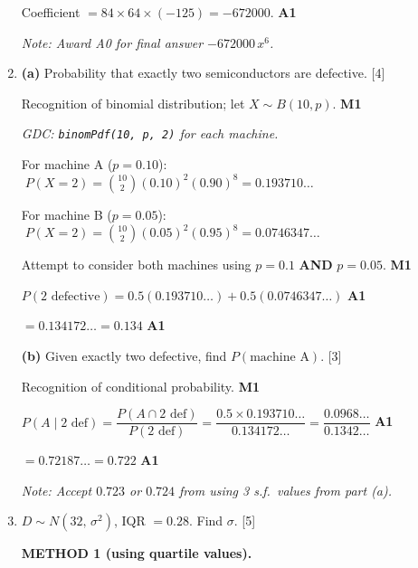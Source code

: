 \documentclass[12pt, twoside]{article}
\begin{document}
\begin{enumerate}[itemsep=0.3cm]
Coefficient $= 84 \times 64 \times (-125) = -672000$. \hfill \textbf{A1}

\textit{Note: Award A0 for final answer $-672000\,x^{6}$.}

\medskip

\item[3.] [Maximum mark: 7]

\textbf{(a)} Probability that exactly two semiconductors are defective. \hfill [4]

\medskip

Recognition of binomial distribution; let $X \sim B(10, p)$. \hfill \textbf{M1}

\textit{GDC: \texttt{binomPdf(10, p, 2)} for each machine.}

For machine A ($p = 0.10$): $\;P(X = 2) = \binom{10}{2}(0.10)^{2}(0.90)^{8} = 0.193710\ldots$

For machine B ($p = 0.05$): $\;P(X = 2) = \binom{10}{2}(0.05)^{2}(0.95)^{8} = 0.0746347\ldots$

Attempt to consider both machines using $p = 0.1$ \textbf{AND} $p = 0.05$. \hfill \textbf{M1}

$P(\text{2 defective}) = 0.5(0.193710\ldots) + 0.5(0.0746347\ldots)$ \hfill \textbf{A1}

$= 0.134172\ldots = 0.134$ \hfill \textbf{A1}

\medskip

\textbf{(b)} Given exactly two defective, find $P(\text{machine A})$. \hfill [3]

\medskip

Recognition of conditional probability. \hfill \textbf{M1}

$P(A \mid \text{2 def}) = \dfrac{P(A \cap \text{2 def})}{P(\text{2 def})} = \dfrac{0.5 \times 0.193710\ldots}{0.134172\ldots} = \dfrac{0.0968\ldots}{0.1342\ldots}$ \hfill \textbf{A1}

$= 0.72187\ldots = 0.722$ \hfill \textbf{A1}

\textit{Note: Accept $0.723$ or $0.724$ from using 3 s.f.\ values from part (a).}

\medskip

\item[4.] [Maximum mark: 5]

$D \sim N(32,\, \sigma^{2})$, IQR $= 0.28$. Find $\sigma$. \hfill [5]

\medskip

\textbf{METHOD 1 (using quartile values).}


\end{enumerate}
\end{document}
